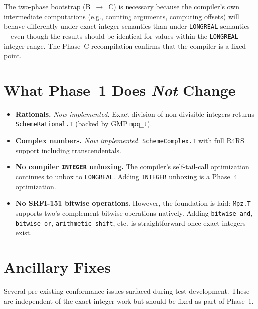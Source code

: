 \documentclass[12pt]{article}
\begin{document}
\medskip\noindent
The two-phase bootstrap (B~$\to$~C) is necessary because the
compiler's own intermediate computations (e.g., counting
arguments, computing offsets) will behave differently under exact
integer semantics than under {\tt LONGREAL} semantics---even
though the results should be identical for values within the
{\tt LONGREAL} integer range.  The Phase~C recompilation confirms
that the compiler is a fixed point.

\section{What Phase~1 Does \emph{Not} Change}
\label{sec:impl-not}

\begin{itemize}
\item \textbf{Rationals.}  \emph{Now implemented.}  Exact division
  of non-divisible integers returns {\tt SchemeRational.T}
  (backed by GMP {\tt mpq\_t}).

\item \textbf{Complex numbers.}  \emph{Now implemented.}
  {\tt SchemeComplex.T} with full R4RS support including
  transcendentals.

\item \textbf{No compiler {\tt INTEGER} unboxing.}  The compiler's
  self-tail-call optimization continues to unbox to {\tt LONGREAL}.
  Adding {\tt INTEGER} unboxing is a Phase~4 optimization.

\item \textbf{No SRFI-151 bitwise operations.}  However, the
  foundation is laid: {\tt Mpz.T} supports two's complement
  bitwise operations natively.  Adding {\tt bitwise-and},
  {\tt bitwise-or}, {\tt arithmetic-shift}, etc.\ is
  straightforward once exact integers exist.
\end{itemize}

\section{Ancillary Fixes}
\label{sec:impl-ancillary}

Several pre-existing conformance issues surfaced during test
development.  These are independent of the exact-integer work but
should be fixed as part of Phase~1.
\end{document}
